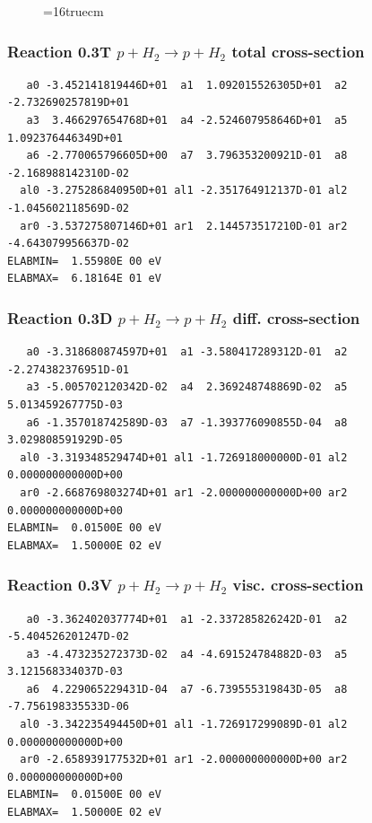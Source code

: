 \documentclass[12pt,dvips]{article}
\begin{document}
\begin{figure} \label{0.2}
\epsfxsize=16truecm
\end{figure}
\newpage

\subsubsection{
Reaction 0.3T    $p + H_2 \rightarrow p + H_2 $  total cross-section
}


\begin{small}\begin{verbatim}
   a0 -3.452141819446D+01  a1  1.092015526305D+01  a2 -2.732690257819D+01
   a3  3.466297654768D+01  a4 -2.524607958646D+01  a5  1.092376446349D+01
   a6 -2.770065796605D+00  a7  3.796353200921D-01  a8 -2.168988142310D-02
  al0 -3.275286840950D+01 al1 -2.351764912137D-01 al2 -1.045602118569D-02
  ar0 -3.537275807146D+01 ar1  2.144573517210D-01 ar2 -4.643079956637D-02
ELABMIN=  1.55980E 00 eV
ELABMAX=  6.18164E 01 eV
\end{verbatim}\end{small}

\subsubsection{
Reaction 0.3D   $ p + H_2 \rightarrow p + H_2 $  diff. cross-section
}


\begin{small}\begin{verbatim}
   a0 -3.318680874597D+01  a1 -3.580417289312D-01  a2 -2.274382376951D-01
   a3 -5.005702120342D-02  a4  2.369248748869D-02  a5  5.013459267775D-03
   a6 -1.357018742589D-03  a7 -1.393776090855D-04  a8  3.029808591929D-05
  al0 -3.319348529474D+01 al1 -1.726918000000D-01 al2  0.000000000000D+00
  ar0 -2.668769803274D+01 ar1 -2.000000000000D+00 ar2  0.000000000000D+00
ELABMIN=  0.01500E 00 eV
ELABMAX=  1.50000E 02 eV
\end{verbatim}\end{small}

\subsubsection{
Reaction 0.3V   $  p + H_2 \rightarrow p + H_2  $ visc. cross-section
}


\begin{small}\begin{verbatim}
   a0 -3.362402037774D+01  a1 -2.337285826242D-01  a2 -5.404526201247D-02
   a3 -4.473235272373D-02  a4 -4.691524784882D-03  a5  3.121568334037D-03
   a6  4.229065229431D-04  a7 -6.739555319843D-05  a8 -7.756198335533D-06
  al0 -3.342235494450D+01 al1 -1.726917299089D-01 al2  0.000000000000D+00
  ar0 -2.658939177532D+01 ar1 -2.000000000000D+00 ar2  0.000000000000D+00
ELABMIN=  0.01500E 00 eV
ELABMAX=  1.50000E 02 eV
\end{verbatim}\end{small}
\end{document}
